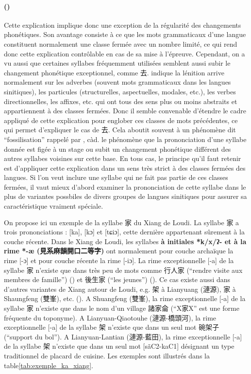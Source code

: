 \documentclass{scrbook}
\newcounter{c}[subsubsection]
\newcommand{\stpc}[1]{\stepcounter{#1}}
\newcommand{\illustre}{Les exemples sont illustrés dans la table\xspace}
\newcommand{\termyyx}[1]{\textbf{#1}}
\begin{document}
\begin{sloppypar}
\stpc{c}\paragraph{()}
Cette explication implique donc une exception de la régularité des changements phonétiques. Son avantage consiste à ce que les mots grammaticaux d'une langue constituent normalement une classe fermée avec un nombre limité, ce qui rend donc cette explication contrôlable en cas de sa mise à l'épreuve. Cependant, on a vu aussi que certaines syllabes fréquemment utilisées semblent aussi subir le changement phonétique exceptionnel, comme 去. \textcite[134]{Cao2022tangxi} indique la lénition arrive normalement sur les adverbes (souvent mots grammaticaux dans les langues sinitiques), les particules (structurelles, aspectuelles, modales, etc.), les verbes directionnelles, les affixes, etc. qui ont tous des sens plus ou moins abstraits et appartiennent à des classes fermées. Donc il semble convenable d'étendre le cadre appliqué de cette explication pour englober ces classes de mots précédentes, ce qui permet d'expliquer le cas de 去. Cela aboutit souvent à un phénomène dit ``fossilisation'' rappelé par \textcite[134]{Cao2022tangxi}, càd. le phénomène que la prononciation d'une syllabe donnée est figée à un stage ou subit un changement phonétique différent des autres syllabes voisines sur cette base. En tous cas, le principe qu'il faut retenir est d'appliquer cette explication dans un sens très strict à des classes fermées des langues. Si l'on veut inclure une syllabe qui ne fait pas partie de ces classes fermées, il vaut mieux d'abord examiner la prononciation de cette syllabe dans le plus de variantes possbiles de divers groupes de langues sinitiques pour assurer sa caractéristique vraiment spéciale. 

On propose ici un exemple de la syllabe 家 du Xiang de Loudi. La syllabe 家 a trois prononciations : [ka], [kɔ] et [tɕiɔ], cette dernière appartenant sûrement à la couche récente. Dans le Xiang de Loudi, les syllabes \termyyx {à initiales *k/x/ʔ- et à la rime *-æ (見系麻韻開口二等字)} ont normalement pour couche archaïque la rime [-ɔ] et pour couche récente la rime [-iɔ]. La rime exceptionnelle [-a] de la syllabe 家 n'existe que dans très peu de mots comme 行人家 (``rendre visite aux membres de famille'') (\cite[211]{Yan1994Loudi}) et 後生家 (``les jeunes'') (\cite[133]{Yan1994Loudi}). Ce cas existe aussi dans d'autres variantes de Xiang autour de Loudi, e.g. 架 à Lianyuang (漣源), 家 à Shaungfeng (雙峯), etc. (\cite[103--105]{Chen2006xiang}). A Shuangfeng (雙峯), la rime exceptionnelle [-a] de la syllabe 家 n'existe que dans le nom d'un village 諸家侖 (``X家X'' est une forme fréquente du toponyme). A Lianyuan-Qiaotouhe (漣源-橋頭河), la rime exceptionnelle [-a] de la syllabe 架 n'existe que dans un seul mot 碗架子 (``support du bol''). A Lianyuan-Lantian (漣源-藍田), la rime exceptionnelle [-a] de la syllabe 架 n'existe que dans un seul mot [sãC2-kaC1] désignant un type traditionnel de placard de cuisine. \illustre \ref{tab:exemple_ka_xiang}.


\end{sloppypar}
\end{document}
